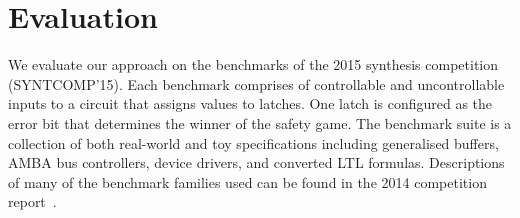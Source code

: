 \documentclass{llncs}
\begin{document}


\section{Evaluation}

We evaluate our approach on the benchmarks of the 2015 synthesis competition
(SYNTCOMP'15). Each benchmark comprises of controllable and uncontrollable
inputs to a circuit that assigns values to latches. One latch is configured as
the error bit that determines the winner of the safety game. The benchmark
suite is a collection of both real-world and toy specifications including
generalised buffers, AMBA bus controllers, device drivers, and converted LTL
formulas.  Descriptions of many of the benchmark families used can be found in
the 2014 competition report~\cite{jacobs2015}. 
\end{document}
